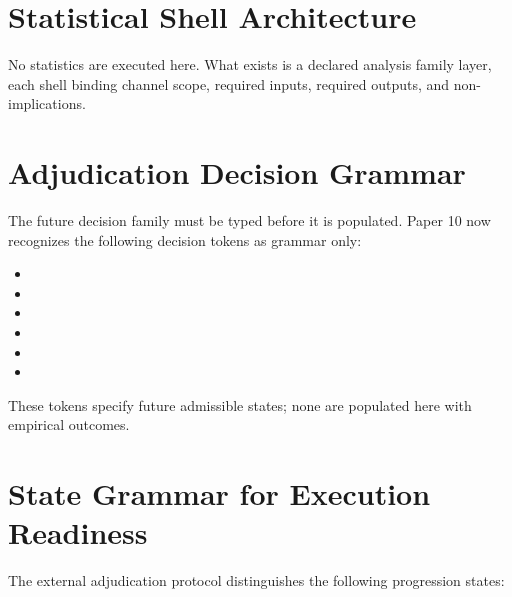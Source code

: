 \documentclass[11pt,a4paper]{article}
\begin{document}
\section{Statistical Shell Architecture}

No statistics are executed here. What exists is a declared analysis family
layer, each shell binding channel scope, required inputs, required outputs, and
non-implications.

\section{Adjudication Decision Grammar}

The future decision family must be typed before it is populated. Paper 10 now
recognizes the following decision tokens as grammar only:

\begin{itemize}
\item \texttt{\allowbreak{}\allowbreak{}\allowbreak{}\allowbreak{}\allowbreak{}\allowbreak{}}
\item \texttt{\allowbreak{}\allowbreak{}}
\item \texttt{\allowbreak{}\allowbreak{}}
\item \texttt{\allowbreak{}\allowbreak{}}
\item \texttt{\allowbreak{}\allowbreak{}\allowbreak{}}
\item \texttt{\allowbreak{}\allowbreak{}\allowbreak{}}
\end{itemize}

These tokens specify future admissible states; none are populated here with empirical outcomes.

\section{State Grammar for Execution Readiness}

The external adjudication protocol distinguishes the following progression states:
\end{document}
